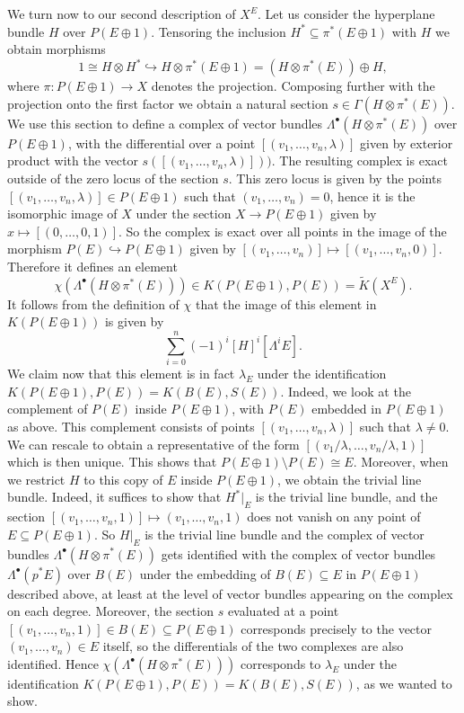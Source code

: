 \documentclass[12pt,a4paper]{amsart}
\theoremstyle{plain}
\theoremstyle{definition}
\theoremstyle{remark}
\begin{document}
We turn now to our second description of $X^{E}$.
Let us consider the hyperplane bundle $H$ over $P(E \oplus 1)$.
Tensoring the inclusion $H^{*} \subseteq \pi^{*}(E \oplus 1)$ with $H$ we obtain morphisms
\[ 1 \cong H \otimes H^{*} \hookrightarrow H \otimes \pi^{*}(E \oplus 1) = (H \otimes \pi^{*}(E)) \oplus H, \]
where $\pi \colon P(E \oplus 1) \to X$ denotes the projection.
Composing further with the projection onto the first factor we obtain a natural section $s \in \Gamma(H \otimes \pi^{*}(E))$.
We use this section to define a complex of vector bundles $\Lambda^{\bullet}(H \otimes \pi^{*}(E))$ over $P(E \oplus 1)$, with the differential over a point $[(v_{1}, \ldots, v_{n}, \lambda)]$ given by exterior product with the vector $s([(v_{1}, \ldots, v_{n}, \lambda)]))$.
The resulting complex is exact outside of the zero locus of the section $s$.
This zero locus is given by the points $[(v_{1}, \ldots, v_{n}, \lambda)] \in P(E \oplus 1)$ such that $(v_{1}, \ldots, v_{n}) = 0$, hence it is the isomorphic image of $X$ under the section $X \to P(E \oplus 1)$ given by $x \mapsto [(0, \ldots, 0, 1)]$.
So the complex is exact over all points in the image of the morphism $P(E) \hookrightarrow P(E \oplus 1)$ given by $[(v_{1}, \ldots, v_{n})] \mapsto [(v_{1}, \ldots, v_{n}, 0)]$.
Therefore it defines an element
\[ \chi(\Lambda^{\bullet}(H \otimes \pi^{*}(E))) \in K(P(E \oplus 1), P(E)) = \tilde{K}(X^{E}). \]
It follows from the definition of $\chi$ \cite[Definition 2.6.2]{ati67} that the image of this element in $K(P(E \oplus 1))$ is given by
\[ \sum_{i = 0}^{n} (-1)^{i} [H]^{i}[\Lambda^{i}E]. \]
We claim now that this element is in fact $\lambda_{E}$ under the identification $K(P(E \oplus 1), P(E)) = K(B(E),S(E))$.
Indeed, we look at the complement of $P(E)$ inside $P(E \oplus 1)$, with $P(E)$ embedded in $P(E \oplus 1)$ as above.
This complement consists of points $[(v_{1}, \ldots, v_{n}, \lambda)]$ such that $\lambda \neq 0$.
We can rescale to obtain a representative of the form $[(v_{1}/\lambda, \ldots, v_{n}/\lambda,1)]$ which is then unique.
This shows that $P(E \oplus 1) \setminus P(E) \cong E$.
Moreover, when we restrict $H$ to this copy of $E$ inside $P(E \oplus 1)$, we obtain the trivial line bundle.
Indeed, it suffices to show that $H^{*}|_{E}$ is the trivial line bundle, and the section $[(v_{1}, \ldots, v_{n}, 1)] \mapsto (v_{1}, \ldots, v_{n},1)$ does not vanish on any point of $E \subseteq P(E \oplus 1)$.
So $H|_{E}$ is the trivial line bundle and the complex of vector bundles $\Lambda^{\bullet}(H \otimes \pi^{*}(E))$ gets identified with the complex of vector bundles $\Lambda^{\bullet}(p^{*}E)$ over $B(E)$ under the embedding of $B(E) \subseteq E$ in $P(E \oplus 1)$ described above, at least at the level of vector bundles appearing on the complex on each degree.
Moreover, the section $s$ evaluated at a point $[(v_{1}, \ldots, v_{n},1)] \in B(E) \subseteq P(E \oplus 1)$ corresponds precisely to the vector $(v_{1}, \ldots, v_{n}) \in E$ itself, so the differentials of the two complexes are also identified.
Hence $\chi(\Lambda^{\bullet}(H \otimes \pi^{*}(E)))$ corresponds to $\lambda_{E}$ under the identification $K(P(E \oplus 1), P(E)) = K(B(E),S(E))$, as we wanted to show.
\end{document}
